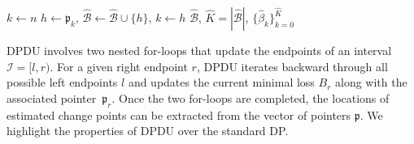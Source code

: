 \documentclass[11pt]{article}
\newcommand{\I}{{\mathcal I }}
\theoremstyle{plain}
\theoremstyle{definition}
\begin{document}
\begin{algorithm}[!ht]
\begin{algorithmic}
    \EndFor
    \State $k \leftarrow  n$
        \State $h \leftarrow  \mathfrak{p}_ k$, $\widehat{\mathcal{B}} \leftarrow \widehat{\mathcal B} \cup  \{h\}$, $k \leftarrow h$
    \EndWhile 
    \OUTPUT $\widehat{\mathcal{B}}$, $\widehat{K} = |\widehat{\mathcal{B}}|$, $\{\widehat{\beta}_k\}_{k = 0}^{\widehat{K}}$
\caption{Dynamic Programming with Dynamic Update. DPDU $(\{(y_t, X_t)\}_{t =1}^{n}, \lambda, \zeta)$} \label{algorithm:DPDU}
\end{algorithmic}
\end{algorithm} 


DPDU involves two nested for-loops that update the endpoints of an interval $\I = [l, r)$. For a given right endpoint $r$, DPDU iterates backward through all possible left endpoints $l$ and updates the current minimal loss $B_r$ along with the associated pointer~$\mathfrak{p}_r$.  Once the two for-loops are completed, the locations of estimated change points can be extracted from the vector of pointers $\mathfrak{p}$.  We highlight the properties of DPDU over the standard DP.
\end{document}
